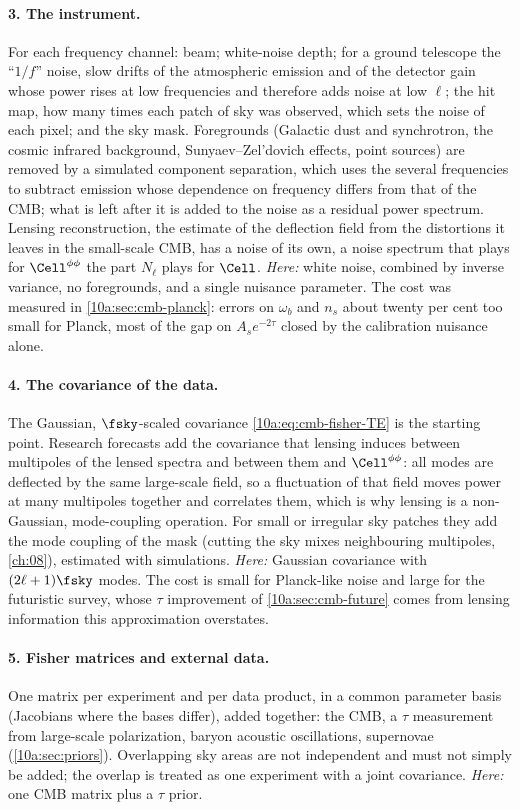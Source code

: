 \paragraph{3. The instrument.} For each frequency channel: beam; white-noise depth; for a ground telescope the ``$1/f$''
noise, slow drifts of the atmospheric emission and of the detector gain whose power rises at low frequencies and
therefore adds noise at low $\ell$; the hit map, how many times each patch of sky was observed, which sets the noise
of each pixel; and the sky mask. Foregrounds (Galactic dust and synchrotron, the cosmic infrared background,
Sunyaev--Zel'dovich effects, point sources) are removed by a simulated component separation, which uses the several
frequencies to subtract emission whose dependence on frequency differs from that of the CMB; what is left after it is
added to the noise as a residual power spectrum. Lensing reconstruction, the estimate of the deflection field from
the distortions it leaves in the small-scale CMB, has a noise of its own, a noise spectrum that plays for
$\Cell^{\phi\phi}$ the part $N_\ell$ plays for $\Cell$. \emph{Here:} white noise, combined by inverse variance, no foregrounds, and a single
nuisance parameter. The cost was measured in \cref{10a:sec:cmb-planck}: errors on $\omega_b$ and $n_s$ about twenty per cent too
small for Planck, most of the gap on $A_se^{-2\tau}$ closed by the calibration nuisance alone.

\paragraph{4. The covariance of the data.} The Gaussian, $\fsky$-scaled covariance \eqref{10a:eq:cmb-fisher-TE} is the starting
point. Research forecasts add the covariance that lensing induces between multipoles of the lensed spectra and
between them and $\Cell^{\phi\phi}$: all modes are deflected by the same large-scale field, so a fluctuation of that field
moves power at many multipoles together and correlates them, which is why lensing is a non-Gaussian, mode-coupling
operation. For small or irregular sky patches they add the mode coupling of the mask (cutting the sky mixes
neighbouring multipoles, \cref{ch:08}), estimated with simulations. \emph{Here:} Gaussian covariance with
$(2\ell+1)\fsky$ modes. The cost is small for Planck-like noise and large for the futuristic survey, whose $\tau$
improvement of \cref{10a:sec:cmb-future} comes from lensing information this approximation overstates.

\paragraph{5. Fisher matrices and external data.} One matrix per experiment and per data product, in a common
parameter basis (Jacobians where the bases differ), added together: the CMB, a $\tau$ measurement from large-scale
polarization, baryon acoustic oscillations, supernovae (\cref{10a:sec:priors}). Overlapping sky areas are not
independent and must not simply be added; the overlap is treated as one experiment with a joint covariance.
\emph{Here:} one CMB matrix plus a $\tau$ prior.

